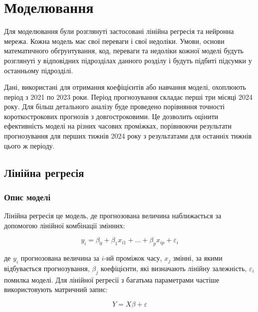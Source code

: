 \chapter{Моделювання}


Для моделювання були розглянуті застосовані лінійна регресія та нейронна мережа. 
Кожна модель має свої переваги і свої недоліки. 
Умови, основи математичного обгрунтування, код, переваги та недоліки кожної моделі будуть розглянуті у відповідних підрозділах данного розділу і будуть підбиті підсумки у останньому підрозділі.

Дані, використані для отримання коефіцієнтів або навчання моделі, охоплюють період з 2021 по 2023 роки. 
Період прогнозування складає перші три місяці 2024 року. 
Для більш детального аналізу буде проведено порівняння точності короткострокових прогнозів з довгостроковими. 
Це дозволить оцінити ефективність моделі на різних часових проміжках, порівнюючи результати прогнозування для перших тижнів 2024 року з результатами для останніх тижнів цього ж періоду.

\section{Лінійна регресія}

\subsection{Опис моделі}

Лінійна регресія це модель, де прогнозована величина наближається за допомогою лінійної комбінації змінних:

$$y_i = \beta_0 + \beta_1 x_{i 1} + \dots + \beta_p x_{i p} + \varepsilon_i$$

де $y_i$ прогнозована величина за $i$-ий проміжок часу, $x_j$ змінні, за якими відбувається прогнозування, $\beta_j$ коефіцієнти, які визначають лінійну залежність, $\varepsilon_i$ помилка моделі. 
Для лінійної регресії з багатьма параметрами частіше використовують матричний запис:

$$Y = X\beta + \varepsilon$$

